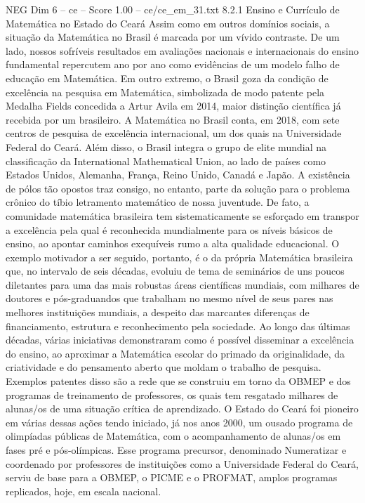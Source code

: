 \begin{textsample}{NEG Dim 6 – ce – Score 1.00 – ce/ce\_em\_31.txt}  \label{ex:f6_neg_251}
8.2.1 Ensino e Currículo de Matemática no Estado do Ceará Assim como em outros domínios sociais, a situação da Matemática no Brasil é marcada por um vívido contraste.
De um lado, nossos sofríveis resultados em avaliações nacionais e internacionais do ensino fundamental repercutem ano por ano como evidências de um modelo falho de educação em Matemática.
Em outro extremo, o Brasil goza da condição de excelência na pesquisa em Matemática, simbolizada de modo patente pela Medalha Fields concedida a Artur Avila em 2014, maior distinção científica já recebida por um brasileiro.
A Matemática no Brasil conta, em 2018, com sete centros de pesquisa de excelência internacional, um dos quais na Universidade Federal do Ceará.
Além disso, o Brasil integra o grupo de elite mundial na classificação da International Mathematical Union, ao lado de países como Estados Unidos, Alemanha, França, Reino Unido, Canadá e Japão.
A existência de pólos tão opostos traz consigo, no entanto, parte da solução para o problema crônico do tíbio letramento matemático de nossa juventude.
De fato, a comunidade matemática brasileira tem sistematicamente se esforçado em transpor a excelência pela qual é reconhecida mundialmente para os níveis básicos de ensino, ao apontar caminhos exequíveis rumo a alta qualidade educacional.
O exemplo motivador a ser seguido, portanto, é o da própria Matemática brasileira que, no intervalo de seis décadas, evoluiu de tema de seminários de uns poucos diletantes para uma das mais robustas áreas científicas mundiais, com milhares de doutores e pós-graduandos que trabalham no mesmo nível de seus pares nas melhores instituições mundiais, a despeito das marcantes diferenças de financiamento, estrutura e reconhecimento pela sociedade.
Ao longo das últimas décadas, várias iniciativas demonstraram como é possível disseminar a excelência do ensino, ao aproximar a Matemática escolar do primado da originalidade, da criatividade e do pensamento aberto que moldam o trabalho de pesquisa.
Exemplos patentes disso são a rede que se construiu em torno da OBMEP e dos programas de treinamento de professores, os quais tem resgatado milhares de alunas/os de uma situação crítica de aprendizado.
O Estado do Ceará foi pioneiro em várias dessas ações tendo iniciado, já nos anos 2000, um ousado programa de olimpíadas públicas de Matemática, com o acompanhamento de alunas/os em fases pré e pós-olímpicas.
Esse programa precursor, denominado Numeratizar e coordenado por professores de instituições como a Universidade Federal do Ceará, serviu de base para a OBMEP, o PICME e o PROFMAT, amplos programas replicados, hoje, em escala nacional.

\end{textsample}

